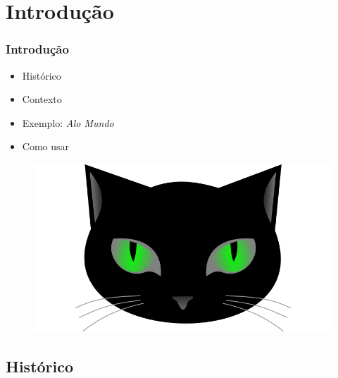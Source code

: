 \section{Introdução}


\begin{frame}
\frametitle{Introdução}
\begin{minipage}{0.47\textwidth}
    \begin{itemize}
        \item Histórico
        \item Contexto
        \item Exemplo: \textit{Alo Mundo}
        \item Como usar
    \end{itemize}
\end{minipage}
\begin{minipage}{0.5\textwidth}
\begin{figure}[ht!]
\begin{center}
\includegraphics[width=1.2\textwidth, height=0.40\textheight]{figures/logo_picat_alex.jpg}
\end{center}
\end{figure}
\end{minipage}
\end{frame}


\subsection{Histórico}

